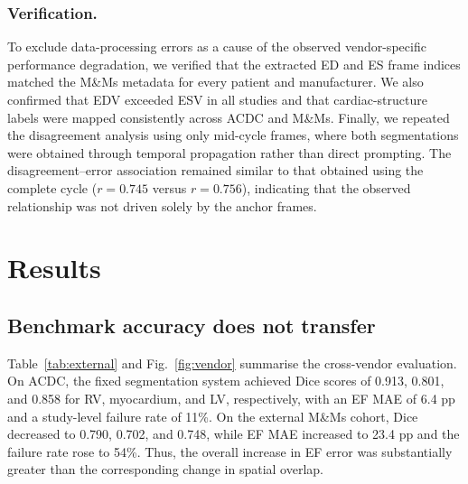 \documentclass[runningheads]{llncs}
\begin{document}
\subsubsection{Verification.}
To exclude data-processing errors as a cause of the observed vendor-specific performance degradation, we verified that the extracted ED and ES frame indices matched the M\&Ms metadata for every patient and manufacturer. We also confirmed that EDV exceeded ESV in all studies and that cardiac-structure labels were mapped consistently across ACDC and M\&Ms. Finally, we repeated the disagreement analysis using only mid-cycle frames, where both segmentations were obtained through temporal propagation rather than direct prompting. The disagreement--error association remained similar to that obtained using the complete cycle ($r=0.745$ versus $r=0.756$), indicating that the observed relationship was not driven solely by the anchor frames.

\section{Results}

\subsection{Benchmark accuracy does not transfer}

Table~\ref{tab:external} and Fig.~\ref{fig:vendor} summarise the cross-vendor evaluation. On ACDC, the fixed segmentation system achieved Dice scores of 0.913, 0.801, and 0.858 for RV, myocardium, and LV, respectively, with an EF MAE of 6.4 pp and a study-level failure rate of 11\%. On the external M\&Ms cohort, Dice decreased to 0.790, 0.702, and 0.748, while EF MAE increased to 23.4 pp and the failure rate rose to 54\%. Thus, the overall increase in EF error was substantially greater than the corresponding change in spatial overlap.
\end{document}

